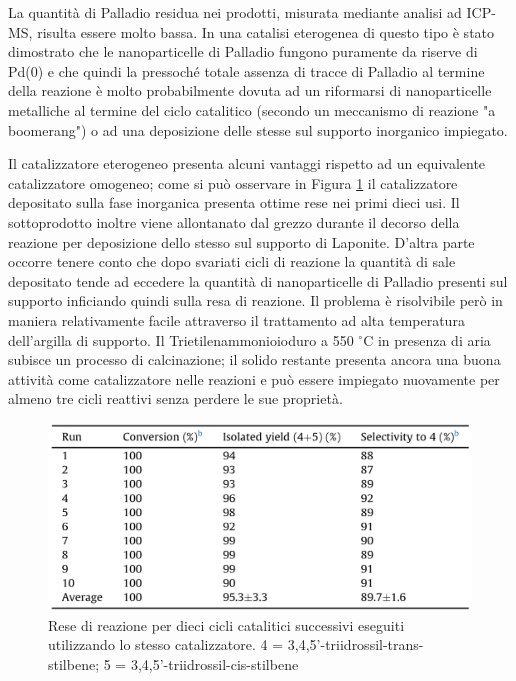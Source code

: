 \documentclass[a4paper, 12pt]{article}
\begin{document}
La quantità di Palladio residua nei prodotti, misurata mediante analisi ad ICP-MS, risulta essere molto bassa. In una catalisi eterogenea di questo tipo è stato dimostrato che le nanoparticelle di Palladio fungono puramente da riserve di Pd(0) e che quindi la pressoché totale assenza di tracce di Palladio al termine della reazione è molto probabilmente dovuta ad un riformarsi di nanoparticelle metalliche al termine del ciclo catalitico (secondo un meccanismo di reazione "a boomerang") o ad una deposizione delle stesse sul supporto inorganico impiegato.

Il catalizzatore eterogeneo presenta alcuni vantaggi rispetto ad un equivalente catalizzatore omogeneo; come si può osservare in Figura \ref{fig:perc_cata_resv} il catalizzatore depositato sulla fase inorganica presenta ottime rese nei primi dieci usi. Il sottoprodotto  inoltre viene allontanato dal grezzo durante il decorso della reazione per deposizione dello stesso sul supporto di Laponite. D'altra parte occorre tenere conto che dopo svariati cicli di reazione la quantità di sale depositato tende ad eccedere la quantità di nanoparticelle di Palladio presenti sul supporto inficiando quindi sulla resa di reazione. Il problema è risolvibile però in maniera relativamente facile attraverso il trattamento ad alta temperatura dell'argilla di supporto. Il Trietilenammonioioduro a 550 $^\circ$C in presenza di aria subisce un processo di calcinazione; il solido restante presenta ancora una buona attività come catalizzatore nelle reazioni e può essere impiegato nuovamente per almeno tre cicli reattivi senza perdere le sue proprietà.

\begin{figure}[H]
	\centering
	\includegraphics[width=\linewidth]{immagini/perc_cata_resv.png}
	\caption{Rese di reazione per dieci cicli catalitici successivi eseguiti utilizzando lo stesso catalizzatore. 4 = 3,4,5'-triidrossil-trans-stilbene; 5 = 3,4,5'-triidrossil-cis-stilbene}
	\label{fig:perc_cata_resv}
\end{figure}
\end{document}
